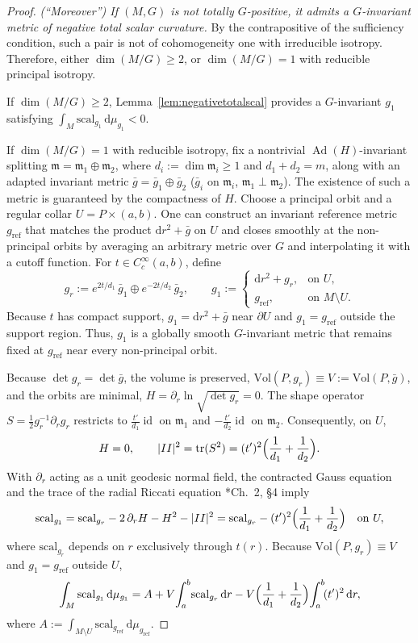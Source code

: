 \documentclass[12pt,a4paper]{amsart}
\theoremstyle{plain}
\theoremstyle{definition}
\theoremstyle{remark}
\DeclareMathOperator{\id}{id}
\DeclareMathOperator{\Ad}{Ad}
\newcommand{\ga}{\mathit{g}} %
\begin{document}
\begin{proof}
\smallskip
\noindent\emph{(``Moreover'') If $(M,G)$ is not totally $G$-positive, it admits a $G$-invariant metric of negative total scalar curvature.} 
By the contrapositive of the sufficiency condition, such a pair is not of cohomogeneity one with irreducible isotropy. Therefore, either $\dim(M/G)\ge2$, or $\dim(M/G)=1$ with reducible principal isotropy.

If $\dim(M/G)\ge2$, Lemma~\ref{lem:negativetotalscal} provides a $G$-invariant $\ga_1$ satisfying $\int_M\mathrm{scal}_{\ga_1}\,\mathrm{d}\mu_{\ga_1}<0$.

If $\dim(M/G)=1$ with reducible isotropy, fix a nontrivial $\Ad(H)$-invariant splitting $\mathfrak{m}=\mathfrak{m}_1\oplus\mathfrak{m}_2$, where $d_i := \dim\mathfrak{m}_i \ge 1$ and $d_1+d_2=m$, along with an adapted invariant metric $\bar{g}=\bar{g}_1\oplus\bar{g}_2$ ($\bar{g}_i$ on $\mathfrak{m}_i$, $\mathfrak{m}_1\perp\mathfrak{m}_2$). The existence of such a metric is guaranteed by the compactness of $H$. Choose a principal orbit and a regular collar $U=P\times(a,b)$. One can construct an invariant reference metric $g_{\mathrm{ref}}$ that matches the product $\mathrm{d}r^2+\bar{g}$ on $U$ and closes smoothly at the non-principal orbits by averaging an arbitrary metric over $G$ and interpolating it with a cutoff function. For $t\in C^\infty_c(a,b)$, define
$$g_r := e^{2t/d_1}\,\bar{g}_1 \oplus e^{-2t/d_2}\,\bar{g}_2,\qquad \ga_1 := \begin{cases}\mathrm{d}r^2+g_r,&\text{on }U,\\ g_{\mathrm{ref}},&\text{on }M\setminus U.\end{cases}$$
Because $t$ has compact support, $\ga_1=\mathrm{d}r^2+\bar{g}$ near $\partial U$ and $\ga_1=g_{\mathrm{ref}}$ outside the support region. Thus, $\ga_1$ is a globally smooth $G$-invariant metric that remains fixed at $g_{\mathrm{ref}}$ near every non-principal orbit. 

Because $\det g_r=\det\bar{g}$, the volume is preserved, $\mathrm{Vol}(P,g_r)\equiv V := \mathrm{Vol}(P,\bar{g})$, and the orbits are minimal, $H=\partial_r\ln\sqrt{\det g_r}=0$. The shape operator $S=\frac{1}{2} g_r^{-1}\partial_r g_r$ restricts to $\frac{t'}{d_1}\id$ on $\mathfrak{m}_1$ and $-\frac{t'}{d_2}\id$ on $\mathfrak{m}_2$. Consequently, on $U$,
$$H=0,\qquad |II|^2=\mathrm{tr}(S^2)=(t')^2\Bigl(\frac{1}{d_1}+\frac{1}{d_2}\Bigr).$$
With $\partial_r$ acting as a unit geodesic normal field, the contracted Gauss equation and the trace of the radial Riccati equation \cite{Petersen}*{Ch.~2, \S4} imply
$$\mathrm{scal}_{\ga_1}=\mathrm{scal}_{g_r}-2\,\partial_r H-H^2-|II|^2=\mathrm{scal}_{g_r}-(t')^2\Bigl(\frac{1}{d_1}+\frac{1}{d_2}\Bigr)\quad\text{on }U,$$
where $\mathrm{scal}_{g_r}$ depends on $r$ exclusively through $t(r)$. Because $\mathrm{Vol}(P,g_r)\equiv V$ and $\ga_1=g_{\mathrm{ref}}$ outside $U$,
$$\int_M\mathrm{scal}_{\ga_1}\,\mathrm{d}\mu_{\ga_1}=A+V\!\int_a^b\!\mathrm{scal}_{g_r}\,\mathrm{d}r-V\Bigl(\frac{1}{d_1}+\frac{1}{d_2}\Bigr)\!\int_a^b\!(t')^2\,\mathrm{d}r,$$
where $A := \int_{M\setminus U}\mathrm{scal}_{g_{\mathrm{ref}}}\,\mathrm{d}\mu_{g_{\mathrm{ref}}}$.


\end{proof}
\end{document}
